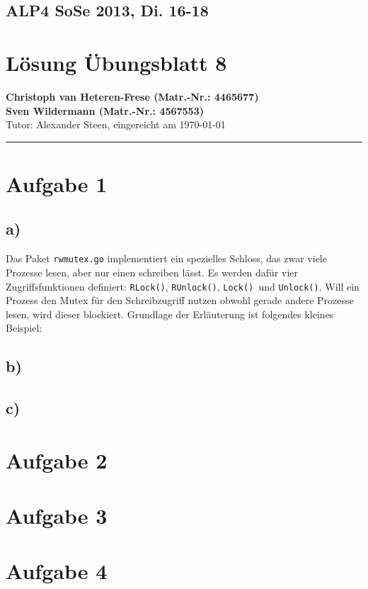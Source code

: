 \documentclass[11pt,a4paper,DIV=10,]{scrartcl}
\begin{document}
\subsection*{ALP4 SoSe 2013, Di. 16-18}
\section*{Lösung Übungsblatt 8}
\textbf{Christoph van Heteren-Frese (Matr.-Nr.: 4465677)} \\ \textbf{Sven Wildermann (Matr.-Nr.: 4567553)}\\
Tutor: Alexander Steen, eingereicht am \today\\
\hrule
\section*{Aufgabe 1}
\subsection*{a)}
Das Paket \texttt{rwmutex.go} implementiert ein spezielles Schloss, das zwar viele Prozesse lesen, aber nur einen schreiben lässt. Es werden dafür vier Zugriffsfunktionen definiert: \texttt{RLock()}, \texttt{RUnlock()}, \texttt{Lock() }und \texttt{Unlock()}. Will ein Prozess den Mutex für den Schreibzugriff nutzen obwohl gerade andere Prozesse lesen, wird dieser blockiert.
Grundlage der Erläuterung ist folgendes kleines Beispiel:

\subsection*{b)}
\subsection*{c)}
\section*{Aufgabe 2}
\section*{Aufgabe 3}
\section*{Aufgabe 4}
\end{document}
